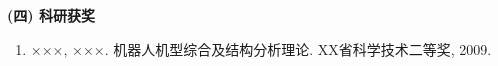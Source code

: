 \begin{achievement}
{\noindent\textbf{(四) 科研获奖}}    %
\begin{enumerate}\setlength{\itemsep}{-0.4em}%
\renewcommand{\labelenumi}{[\theenumi]}
\item ×××, ×××. 机器人机型综合及结构分析理论. XX省科学技术二等奖, 2009.
\end{enumerate}
\end{achievement}
